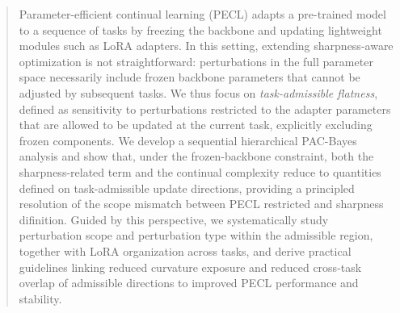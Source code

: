 \documentclass{article}
\theoremstyle{plain}
\theoremstyle{definition}
\theoremstyle{remark}
\begin{document}


\begin{abstract}

Parameter-efficient continual learning (PECL) adapts a pre-trained model to a sequence of tasks by freezing the backbone and updating lightweight modules such as LoRA adapters. 
In this setting, extending sharpness-aware optimization is not straightforward: perturbations in the full parameter space necessarily include frozen backbone parameters that cannot be adjusted by subsequent tasks. 
We thus focus on \emph{task-admissible flatness}, defined as sensitivity to perturbations restricted to the adapter parameters that are allowed to be updated at the current task, explicitly excluding frozen components.
We develop a sequential hierarchical PAC-Bayes analysis and show that, under the frozen-backbone constraint, both the sharpness-related term and the continual complexity reduce to quantities defined on task-admissible update directions, providing a principled resolution of the scope mismatch between PECL restricted and sharpness difinition.
Guided by this perspective, we systematically study perturbation scope and perturbation type within the admissible region, together with LoRA organization across tasks, and derive  practical guidelines linking reduced curvature exposure and reduced cross-task overlap of admissible directions to improved PECL performance and stability.

\end{abstract}
\end{document}
